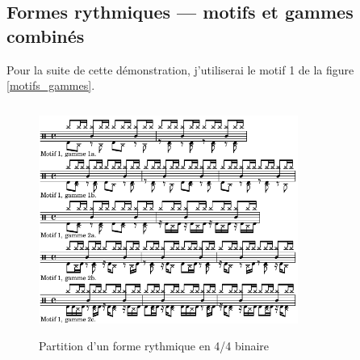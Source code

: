 \subsection*{Formes rythmiques — motifs et gammes combinés}
Pour la suite de cette démonstration, j’utiliserai le motif 1 de la
figure \ref{motifs_gammes}.
\begin{figure}[h]
\centering
\includegraphics[height=75mm, width=85mm]{
z_images/4_experimentations/2_reecriture_guidee/2_systeme_4-4_binaire.png}
\caption{Partition d’un forme rythmique en 4/4 binaire}
\label{sys_binaire}
\end{figure}
